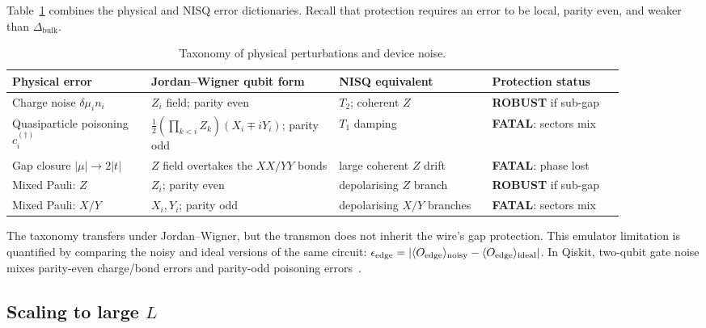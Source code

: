 Table~\ref{tab:taxonomy} combines the physical and NISQ error dictionaries.
Recall that protection requires an error to be local, parity even, and weaker
than $\Delta_{\mathrm{bulk}}$.

\begin{table}[H]
\centering
\scriptsize
\setlength{\tabcolsep}{3.5pt}
\begin{tabular}{@{}p{0.20\linewidth}p{0.27\linewidth}p{0.22\linewidth}p{0.19\linewidth}@{}}
\toprule
Physical error & Jordan--Wigner qubit form & NISQ equivalent & Protection status \\
\midrule
Charge noise $\delta\mu_i n_i$
 & $Z_i$ field; parity even
 & $T_2$; coherent $Z$
 & \textcolor{blue!70!black}{\textbf{ROBUST}} if sub-gap \\
Quasiparticle poisoning $c_i^{(\dagger)}$
 & $\frac12(\prod_{k<i}Z_k)(X_i\!\mp iY_i)$; parity odd
 & $T_1$ damping
 & \textcolor{red!70!black}{\textbf{FATAL}}: sectors mix \\
Gap closure $|\mu|\to2|t|$
 & $Z$ field overtakes the $XX/YY$ bonds
 & large coherent $Z$ drift
 & \textcolor{red!70!black}{\textbf{FATAL}}: phase lost \\
Mixed Pauli: $Z$
 & $Z_i$; parity even
 & depolarising $Z$ branch
 & \textcolor{blue!70!black}{\textbf{ROBUST}} if sub-gap \\
Mixed Pauli: $X/Y$
 & $X_i,Y_i$; parity odd
 & depolarising $X/Y$ branches
 & \textcolor{red!70!black}{\textbf{FATAL}}: sectors mix \\
\bottomrule
\end{tabular}
\caption{Taxonomy of physical perturbations and device noise.}
\label{tab:taxonomy}
\end{table}

The taxonomy transfers under Jordan--Wigner, but the transmon does not inherit
the wire's gap protection. This emulator limitation is quantified by comparing
the noisy and ideal versions of the same circuit:
$\epsilon_{\rm edge}=|\langle O_{\mathrm{edge}}\rangle_{\rm noisy}-\langle O_{\mathrm{edge}}\rangle_{\rm ideal}|$.
In Qiskit, two-qubit gate noise mixes parity-even charge/bond errors and
parity-odd poisoning errors~\cite{qiskit2024}.

\subsection{Scaling to large \texorpdfstring{$L$}{L}}

